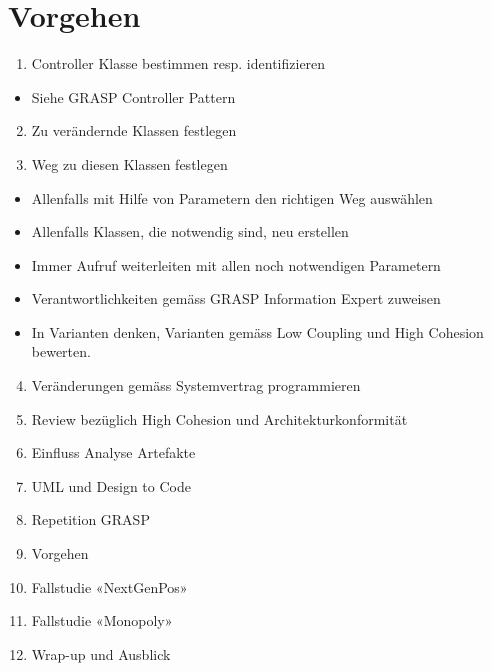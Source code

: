 \documentclass[10pt]{article}
\begin{document}
\section*{Vorgehen}
\begin{enumerate}
  \item Controller Klasse bestimmen resp. identifizieren
\end{enumerate}

\begin{itemize}
  \item Siehe GRASP Controller Pattern
\end{itemize}

\begin{enumerate}
  \setcounter{enumi}{1}
  \item Zu verändernde Klassen festlegen
  \item Weg zu diesen Klassen festlegen
\end{enumerate}

\begin{itemize}
  \item Allenfalls mit Hilfe von Parametern den richtigen Weg auswählen
  \item Allenfalls Klassen, die notwendig sind, neu erstellen
  \item Immer Aufruf weiterleiten mit allen noch notwendigen Parametern
  \item Verantwortlichkeiten gemäss GRASP Information Expert zuweisen
  \item In Varianten denken, Varianten gemäss Low Coupling und High Cohesion bewerten.
\end{itemize}

\begin{enumerate}
  \setcounter{enumi}{3}
  \item Veränderungen gemäss Systemvertrag programmieren
  \item Review bezüglich High Cohesion und Architekturkonformität
  \item Einfluss Analyse Artefakte
  \item UML und Design to Code
  \item Repetition GRASP
  \item Vorgehen
  \item Fallstudie «NextGenPos»
  \item Fallstudie «Monopoly»
  \item Wrap-up und Ausblick
\end{enumerate}
\end{document}
